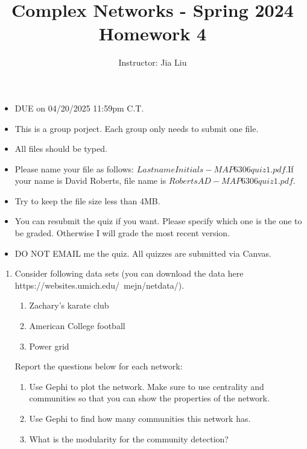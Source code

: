 \documentclass{amsart}
\theoremstyle{definition}
\theoremstyle{remark}
\numberwithin{equation}{section}
\begin{document}
\title{Complex Networks  - Spring 2024\\{\bf Homework 4}}%
\author{Instructor: Jia Liu}%
\date{}


\maketitle
\begin{itemize}
\item DUE on  04/20/2025 11:59pm C.T.
\item This is a group porject. Each group only needs to submit one file.
\item All files should be typed. 
\item Please name your file as follows: $LastnameInitials-MAP6306quiz1.pdf$.If your name is  David Roberts, file name is $RobertsAD-MAP6306quiz1.pdf$.
\item Try to keep the file size less than 4MB.
\item You can resubmit the quiz if you want. Please specify which one is the one to be graded. Otherwise I will grade the most recent version.
\item DO NOT EMAIL me the quiz. All quizzes are submitted via Canvas.
\end{itemize}


\clearpage
\begin{enumerate}



\item Consider following data sets (you can download the data here https://websites.umich.edu/~mejn/netdata/).
\begin{enumerate}
\item Zachary's karate club
\item American College football
\item Power grid
\end{enumerate}

\vspace{2cm}

Report the questions below for each network:
\begin{enumerate}
\item Use Gephi to plot the network. Make sure to use centrality and communities so that you can show the properties of the network.
\item Use Gephi to find how many communities this network has. 
\item What is the modularity for the community detection?
\end{enumerate}
\end{enumerate}
\end{document}
